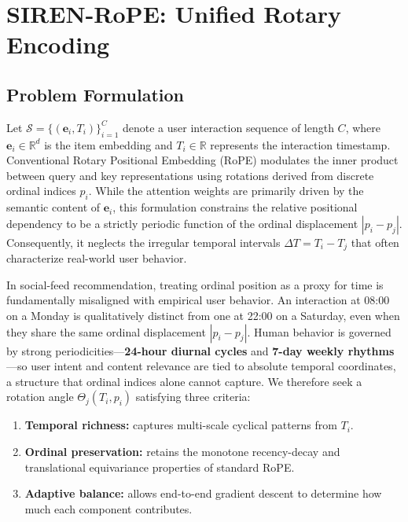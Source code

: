 \documentclass{article}
\begin{document}
\section{SIREN-RoPE: Unified Rotary Encoding}
\label{sec:method}

\subsection{Problem Formulation}

Let $\mathcal{S} = \{(\mathbf{e}_i, T_i)\}_{i=1}^{C}$ denote a user interaction sequence of
length $C$, where $\mathbf{e}_i \in \mathbb{R}^{d}$ is the item embedding and $T_i \in \mathbb{R}$ represents
the interaction timestamp. Conventional Rotary Positional Embedding (RoPE) \citep{su2024roformer} modulates
the inner product between query and key representations using rotations derived from discrete ordinal indices $p_i$.
While the attention weights are primarily driven by the semantic content of $\mathbf{e}_i$, this formulation constrains
the relative positional dependency to be a strictly periodic function of the ordinal displacement $|p_i - p_j|$.
Consequently, it neglects the irregular temporal intervals $\Delta T = T_i - T_j$ that often characterize real-world user behavior.

In social-feed recommendation, treating ordinal position as a proxy for time is fundamentally misaligned with empirical user behavior.
An interaction at 08:00 on a Monday is qualitatively distinct from one at 22:00 on a Saturday, even when they share the same ordinal
displacement $|p_i - p_j|$. Human behavior is governed by strong periodicities---\textbf{24-hour diurnal cycles} and \textbf{7-day weekly
rhythms}---so user intent and content relevance are tied to absolute temporal coordinates, a structure that ordinal indices alone cannot capture.
We therefore seek a rotation angle
$\Theta_j(T_i, p_i)$ satisfying three criteria:
\begin{enumerate}
  \item \textbf{Temporal richness:} captures multi-scale cyclical patterns
    from $T_i$.
  \item \textbf{Ordinal preservation:} retains the monotone recency-decay and
    translational equivariance properties of standard RoPE.
  \item \textbf{Adaptive balance:} allows end-to-end gradient descent to
    determine how much each component contributes.
\end{enumerate}
\end{document}

